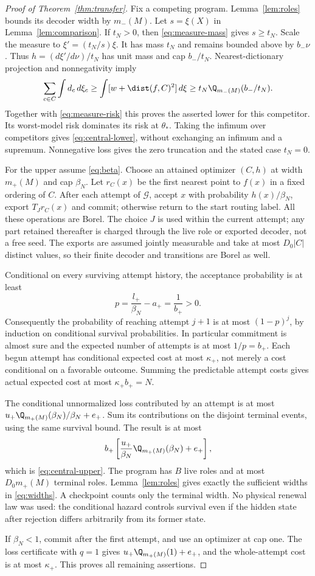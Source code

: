 \begin{proof}[Proof of Theorem~\ref{thm:transfer}]
Fix a competing program. Lemma~\ref{lem:roles} bounds its decoder width by $m_-(M)$. Let $s=\xi(X)$ in Lemma~\ref{lem:comparison}. If $t_N>0$, then \eqref{eq:measure-mass} gives $s\ge t_N$. Scale the measure to $\xi'=(t_N/s)\xi$. It has mass $t_N$ and remains bounded above by $b_-\nu$. Thus $h=(d\xi'/d\nu)/t_N$ has unit mass and cap $b_-/t_N$. Nearest-dictionary projection and nonnegativity imply
\[
 \sum_{c\in C}\int d_c\,d\xi_c
 \ge\int [w+\dist(f,C)^2]\,d\xi
 \ge t_N\Q_{m_-(M)}(b_-/t_N).
\]
Together with \eqref{eq:measure-risk} this proves the asserted lower for this competitor. Its worst-model risk dominates its risk at $\theta_*$. Taking the infimum over competitors gives \eqref{eq:central-lower}, without exchanging an infimum and a supremum. Nonnegative loss gives the zero truncation and the stated case $t_N=0$.

For the upper assume \eqref{eq:beta}. Choose an attained optimizer $(C,h)$ at width $m_+(M)$ and cap $\beta_N$. Let $r_C(x)$ be the first nearest point to $f(x)$ in a fixed ordering of $C$. After each attempt of $\mathcal G$, accept $x$ with probability $h(x)/\beta_N$, export $T_Jr_C(x)$ and commit; otherwise return to the start routing label. All these operations are Borel. The choice $J$ is used within the current attempt; any part retained thereafter is charged through the live role or exported decoder, not a free seed. The exports are assumed jointly measurable and take at most $D_0|C|$ distinct values, so their finite decoder and transitions are Borel as well.

Conditional on every surviving attempt history, the acceptance probability is at least
\begin{equation}\label{eq:hazard}
 p=\frac{l_+}{\beta_N}-a_+=\frac1{b_+}>0.
\end{equation}
Consequently the probability of reaching attempt $j+1$ is at most $(1-p)^j$, by induction on conditional survival probabilities. In particular commitment is almost sure and the expected number of attempts is at most $1/p=b_+$. Each begun attempt has conditional expected cost at most $\kappa_+$, not merely a cost conditional on a favorable outcome. Summing the predictable attempt costs gives actual expected cost at most $\kappa_+b_+=N$.

The conditional unnormalized loss contributed by an attempt is at most $u_+\Q_{m_+(M)}(\beta_N)/\beta_N+e_+$. Sum its contributions on the disjoint terminal events, using the same survival bound. The result is at most
\[
 b_+\left[\frac{u_+}{\beta_N}\Q_{m_+(M)}(\beta_N)+e_+\right],
\]
which is \eqref{eq:central-upper}. The program has $B$ live roles and at most $D_0m_+(M)$ terminal roles. Lemma~\ref{lem:roles} gives exactly the sufficient widths in \eqref{eq:widths}. A checkpoint counts only the terminal width. No physical renewal law was used: the conditional hazard controls survival even if the hidden state after rejection differs arbitrarily from its former state.

If $\beta_N<1$, commit after the first attempt, and use an optimizer at cap one. The loss certificate with $q=1$ gives $u_+\Q_{m_+(M)}(1)+e_+$, and the whole-attempt cost is at most $\kappa_+$. This proves all remaining assertions.
\end{proof}
